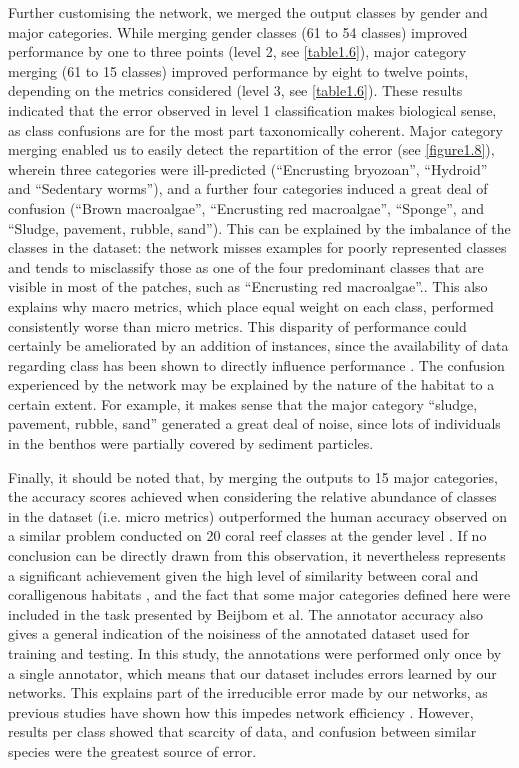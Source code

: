 Further customising the network, we merged the output classes by gender and major categories. While merging gender classes (61 to 54 classes) improved performance by one to three points (level 2, see \autoref{table1.6}), major category merging (61 to 15 classes) improved performance by eight to twelve points, depending on the metrics considered (level 3, see \autoref{table1.6}). These results indicated that the error observed in level 1 classification makes biological sense, as class confusions are for the most part taxonomically coherent. Major category merging enabled us to easily detect the repartition of the error (see \autoref{figure1.8}), wherein three categories were ill-predicted (“Encrusting bryozoan”, “Hydroid” and “Sedentary worms”), and a further four categories induced a great deal of confusion (“Brown macroalgae”, “Encrusting red macroalgae”, “Sponge”, and “Sludge, pavement, rubble, sand”). This can be explained by the imbalance of the classes in the dataset: the network misses examples for poorly represented classes and tends to misclassify those as one of the four predominant classes that are visible in most of the patches, such as “Encrusting red macroalgae”.. This also explains why macro metrics, which place equal weight on each class, performed consistently worse than micro metrics. This disparity of performance could certainly be ameliorated by an addition of instances, since the availability of data regarding class has been shown to directly influence performance \citep{zhou_learning_2014}. The confusion experienced by the network may be explained by the nature of the habitat to a certain extent. For example, it makes sense that the major category “sludge, pavement, rubble, sand” generated a great deal of noise, since lots of individuals in the benthos were partially covered by sediment particles.

Finally, it should be noted that, by merging the outputs to 15 major categories, the accuracy scores achieved when considering the relative abundance of classes in the dataset (i.e. micro metrics) outperformed the human accuracy observed on a similar problem conducted on 20 coral reef classes at the gender level \citep{beijbom_towards_2015}. If no conclusion can be directly drawn from this observation, it nevertheless represents a significant achievement given the high level of similarity between coral and coralligenous habitats \citep{bianchi_biocostruzione_2001}, and the fact that some major categories defined here were included in the task presented by Beijbom et al. The annotator accuracy also gives a general indication of the noisiness of the annotated dataset used for training and testing. In this study, the annotations were performed only once by a single annotator, which means that our dataset includes errors learned by our networks. This explains part of the irreducible error made by our networks, as previous studies have shown how this impedes network efficiency \citep{mishkin_systematic_2016}. However, results per class showed that scarcity of data, and confusion between similar species were the greatest source of error. 

